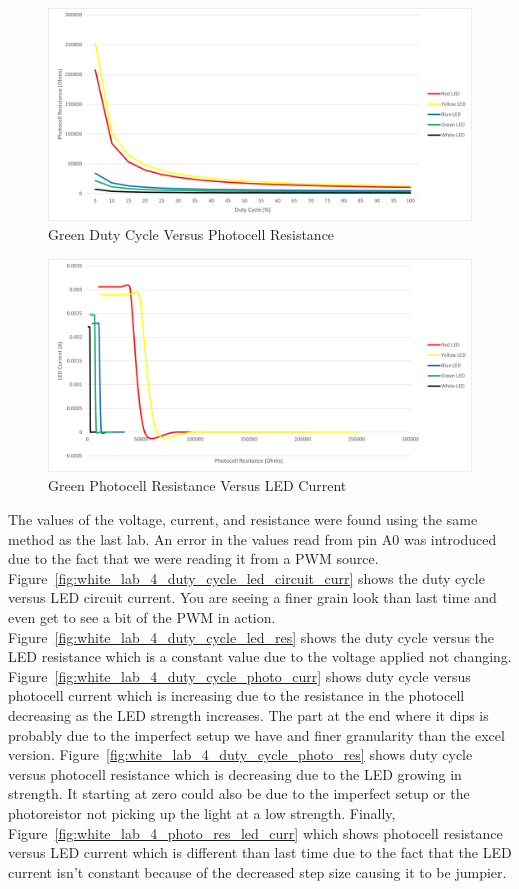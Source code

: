 \documentclass[12pt,titlepage]{article}
\begin{document}
\begin{figure}[!htb]
\centering
\includegraphics[width=5in]{lab_4/duty_cycle_photo_res.png}
\caption{Green Duty Cycle Versus Photocell Resistance}
\end{figure}
\begin{figure}[!htb]
  \centering
  \includegraphics[width=5in]{lab_4/photo_res_led_curr.png}
  \caption{Green Photocell Resistance Versus LED Current}
\end{figure}
The values of the voltage, current, and resistance were found using the same method as the last lab. An error in the values read from pin A0 was introduced due to
the fact that we were reading it from a PWM source. Figure~\ref{fig:white_lab_4_duty_cycle_led_circuit_curr} shows the
duty cycle versus LED circuit current. You are seeing a finer grain look than last time and even get to see a bit of the PWM in action. Figure~\ref{fig:white_lab_4_duty_cycle_led_res}
shows the duty cycle versus the LED resistance which is a constant value due to the voltage applied not changing. Figure~\ref{fig:white_lab_4_duty_cycle_photo_curr}
shows duty cycle versus photocell current which is increasing due to the resistance in the photocell decreasing as the LED strength increases. The part at the end where it dips
is probably due to the imperfect setup we have and finer granularity than the excel version. Figure~\ref{fig:white_lab_4_duty_cycle_photo_res} shows duty cycle versus photocell
resistance which is decreasing due to the LED growing in strength. It starting at zero could also be due to the imperfect setup or the photoreistor not picking up the light at a
low strength. Finally, Figure~\ref{fig:white_lab_4_photo_res_led_curr} which shows photocell resistance versus LED current which is different than last time due to the fact that
the LED current isn't constant because of the decreased step size causing it to be jumpier.
\end{document}
